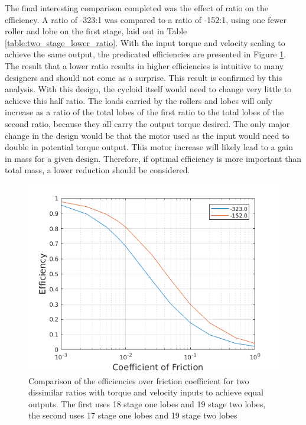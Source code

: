 The final interesting comparison completed was the effect of ratio on the efficiency. A ratio of -323:1 was compared to a ratio of -152:1, using one fewer roller and lobe on the first stage, laid out in Table \ref{table:two_stage_lower_ratio}. With the input torque and velocity scaling to achieve the same output, the predicated efficiencies are presented in Figure \ref{fig:two_stage_lower_ratio}. The result that a lower ratio results in higher efficiencies is intuitive to many designers and should not come as a surprise. This result is confirmed by this analysis. With this design, the cycloid itself would need to change very little to achieve this half ratio. The loads carried by the rollers and lobes will only increase as a ratio of the total lobes of the first ratio to the total lobes of the second ratio, because they all carry the output torque desired. The only major change in the design would be that the motor used as the input would need to double in potential torque output. This motor increase will likely lead to a gain in mass for a given design. Therefore, if optimal efficiency is more important than total mass, a lower reduction should be considered. 

\begin{figure}[!t]
	\centering
	\includegraphics[width=0.75\linewidth]{fig/two_stage_lower_ratio}
   \caption{Comparison of the efficiencies over friction coefficient for two dissimilar ratios with torque and velocity inputs to achieve equal outputs. The first uses 18 stage one lobes and 19 stage two lobes, the second uses 17 stage one lobes and 19 stage two lobes}
   \label{fig:two_stage_lower_ratio}
\end{figure}
